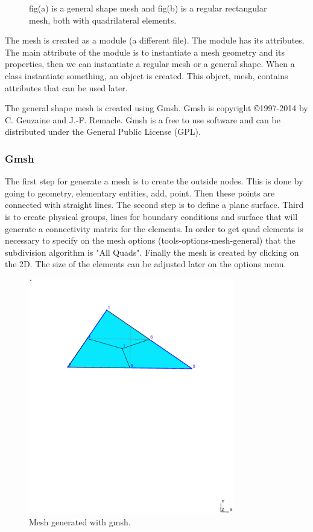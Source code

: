 \documentclass[10pt, a4paper]{article}
\begin{document}
\begin{figure}[H]
\begin{subfigure}[H]{0.49\textwidth}
		\caption{}
		\label{fig:2}
	\end{subfigure}
	\caption{fig(a) is a general shape mesh and fig(b) is a regular rectangular mesh, both with quadrilateral elements.}
	\label{fig:3_1}
\end{figure}

The mesh is created as a module (a different file). The module has its attributes. The main attribute of the module is to instantiate a mesh geometry and its properties, then we can instantiate a regular mesh or a general shape. When a class instantiate something, an object is created. This object, mesh, contains attributes that can be used later.

The general shape mesh is created using Gmsh. Gmsh is copyright \copyright 1997-2014 by C. Geuzaine and J.-F. Remacle. Gmsh is a free to use software and can be distributed under the General Public License (GPL).

\subsubsection{Gmsh}

The first step for generate a mesh is to create the outside nodes. This is done by going to geometry, elementary entities, add, point. Then these points are connected with straight lines. The second step is to define a plane surface. Third is to create physical groups, lines for boundary conditions and surface that will generate a connectivity matrix for the elements. In order to get quad elements is necessary to specify on the mesh options (tools-options-mesh-general) that the subdivision algorithm is "All Quads". Finally the mesh is created by clicking on the 2D. The size of the elements can be adjusted later on the options menu.


\begin{figure}[H]
\centering
\includegraphics[trim = 0 550 0 100, clip,width=0.8\textwidth]{fig/meshgmsh.eps}
\caption{Mesh generated with gmsh.}
\end{figure}
\end{document}
